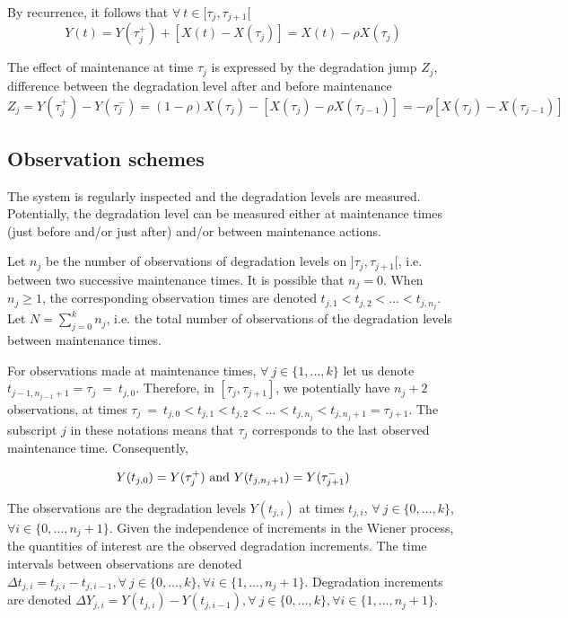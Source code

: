 \noindent By recurrence, it follows that $\forall\ t \in [\tau_j,\tau_{j+1}[$ 
\begin{equation}
Y(t)=Y(\tau_{j}^+)+\left[ X(t)-X(\tau_j)\right]
=X(t)-\rho X(\tau_j)
\label{eq:Y(t)}
\end{equation}

\noindent The effect of maintenance at time $\tau_j$ is expressed by the degradation jump $Z_j$, difference between the degradation level after and before maintenance
\begin{equation}
Z_j = Y(\tau_{j}^+) - Y(\tau_{j}^-) = (1-\rho) X(\tau_j) - \left[ X(\tau_j) - \rho X(\tau_{j-1}) \right] = -\rho \left[X(\tau_{j})-X(\tau_{j-1})\right]
\label{eq:Z_j}
\end{equation}


\subsection{Observation schemes} 
\label{section:scheme}

The system is regularly inspected and the degradation levels are measured. Potentially, the degradation level can be measured either at maintenance times (just before and/or just after) and/or between maintenance actions.

Let $n_j$ be the number of observations of degradation levels on $]\tau_j, \tau_{j+1}[$, i.e. between two successive maintenance times. It is possible that $n_j=0$. When $n_j \geq 1$, the corresponding observation times are denoted $t_{j,1} < t_{j,2} <...<t_{j,n_j}$. Let $N=\sum\limits_{j=0}^{k} n_j$, i.e. the total number of observations of the degradation levels between maintenance times.

For observations made at maintenance times, $\forall\ j \in \{1,...,k\}$ let us denote $t_{j-1,n_{j-1}+1}=\tau_j\ =\ t_{j,0}$. Therefore, in $[\tau_j, \tau_{j+1}]$, we  potentially have $n_j+2$ observations, at times $\tau_j\ =\ t_{j,0} < t_{j,1} < t_{j,2} <...< t_{j,n_j} < t_{j,n_j+1} = \tau_{j+1}$. The subscript $j$ in these notations means that $\tau_j$ corresponds to the last observed maintenance time. Consequently,

$$Y(t_{j,0})=Y(\tau_j^+) \hbox{ and } Y(t_{j,n_j+1})=Y(\tau_{j+1}^-)$$

The observations are the degradation levels $Y(t_{j,i})$ at times $t_{j,i}$, $\forall\ j \in \{0,...,k\}$, $\forall i \in\{0,...,n_j+1\}$. 
Given the independence of increments in the Wiener process, the quantities of interest are the observed degradation increments. 
The time intervals between observations are denoted $\Delta t_{j,i}=t_{j,i}-t_{j,i-1}, \forall\ j \in \{0,...,k\}, \forall i \in\{1,...,n_j+1\}$.
Degradation increments are denoted
$\Delta Y_{j,i}=Y(t_{j,i})-Y(t_{j,i-1}), \forall\ j \in \{0,...,k\}, \forall i \in \{1,...,n_j+1\}$.

